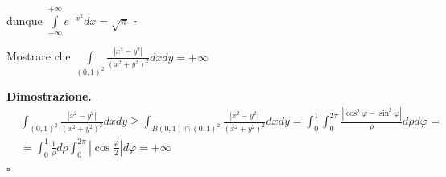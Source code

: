	dunque $\int\limits_{-\infty}^{+\infty} e^{-x^2} dx = \sqrt{\pi}$ 
\hfill $\square$
%
\vspace{0.5cm}
\begin{exercise}
	Mostrare che $\int\limits_{(0,1)^2} \frac{|x^2 - y^2|}{(x^2 + y^2)^2}dxdy = +\infty$
\end{exercise}
%
\noindent \textbf{Dimostrazione. }
	\begin{align*}
	&\int_{(0,1)^2} \frac{|x^2 - y^2|}{(x^2 + y^2)^2}dxdy \geq \int_{B(0,1) \cap (0,1)^2} \frac{|x^2 - y^2|}{(x^2 + y^2)^2} dxdy = \int_{0}^1 \int_0^{2\pi} \frac{|\cos^2{\varphi} - \sin^2{\varphi}|}{\rho} d\rho d\varphi = \\
	&=\int_0^{1} \frac{1}{\rho} d\rho \int_0^{2\pi} |\cos{\frac{\varphi}{2}}| d\varphi = +\infty
	\end{align*}
\hfill $\square$
%
\vspace{0.5cm}

